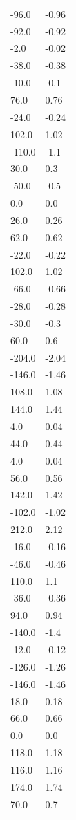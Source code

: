 \begin{longtable}{ll}
-96.0 & -0.96 \\
-92.0 & -0.92 \\
-2.0 & -0.02 \\
-38.0 & -0.38 \\
-10.0 & -0.1 \\
76.0 & 0.76 \\
-24.0 & -0.24 \\
102.0 & 1.02 \\
-110.0 & -1.1 \\
30.0 & 0.3 \\
-50.0 & -0.5 \\
0.0 & 0.0 \\
26.0 & 0.26 \\
62.0 & 0.62 \\
-22.0 & -0.22 \\
102.0 & 1.02 \\
-66.0 & -0.66 \\
-28.0 & -0.28 \\
-30.0 & -0.3 \\
60.0 & 0.6 \\
-204.0 & -2.04 \\
-146.0 & -1.46 \\
108.0 & 1.08 \\
144.0 & 1.44 \\
4.0 & 0.04 \\
44.0 & 0.44 \\
4.0 & 0.04 \\
56.0 & 0.56 \\
142.0 & 1.42 \\
-102.0 & -1.02 \\
212.0 & 2.12 \\
-16.0 & -0.16 \\
-46.0 & -0.46 \\
110.0 & 1.1 \\
-36.0 & -0.36 \\
94.0 & 0.94 \\
-140.0 & -1.4 \\
-12.0 & -0.12 \\
-126.0 & -1.26 \\
-146.0 & -1.46 \\
18.0 & 0.18 \\
66.0 & 0.66 \\
0.0 & 0.0 \\
118.0 & 1.18 \\
116.0 & 1.16 \\
174.0 & 1.74 \\
70.0 & 0.7 \\

\end{longtable}
